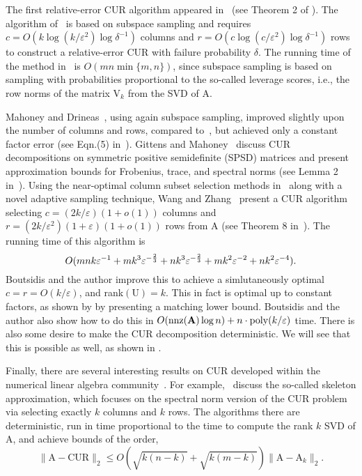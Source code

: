 \documentclass[11pt]{article}
\newcommand{\TNorm }[1]{\mbox{}\|#1\|_2  }
\newcommand{\mat}[1]{{\ensuremath{\bm{\mathrm{#1}}}}}
\def\matA{\mat{A}}
\def\matC{\mat{C}}
\def\matR{\mat{R}}
\def\matU{\mat{U}}
\def\matV{\mat{V}}
\def\nnz{{ \rm nnz }}
\def\frac#1#2{{#1\over #2}}
\newcommand{\eps}{\varepsilon}
\newcommand{\poly}{{\mathrm{poly}}}
\begin{document}
The first relative-error CUR algorithm appeared in~\cite{DMM08} (see Theorem 2 of \cite{DMM08}). The
algorithm of~\cite{DMM08} is based on subspace sampling and requires 
$c = O(k \log(k / \varepsilon^2)  \log \delta^{-1})$ columns and
$r=O(c \log (c / \varepsilon^2) \log \delta^{-1})$ rows to construct a relative-error CUR with failure probability $\delta$.
The running time of the method in~\cite{DMM08} is $O( m n \min\{m,n\} )$, since subspace sampling is based on sampling with probabilities
proportional to the so-called leverage scores, i.e., the row norms of the matrix $\matV_k$ from the SVD of $\matA$.

Mahoney and Drineas~\cite{DM09}, using again subspace sampling, improved slightly upon the number of columns and rows,
compared to~\cite{DMM08}, but achieved only a constant factor error (see Eqn.(5) in~\cite{DM09}).
Gittens and Mahoney~\cite{GM13} discuss CUR decompositions on symmetric positive semidefinite (SPSD) 
matrices and present approximation bounds for Frobenius,
trace, and spectral norms (see Lemma 2 in~\cite{GM13}).
Using the near-optimal column subset selection methods in~\cite{BDM11a} along with a novel adaptive sampling technique, Wang and Zhang~\cite{WZ13CUR} present a CUR
algorithm selecting
$c = (2k/\varepsilon)(1+o(1))$
columns and
$r = (2k/\varepsilon^2)(1+\varepsilon)(1+o(1))$
rows from $\matA$
(see Theorem 8 in~\cite{WZ13CUR}).
The running time of this algorithm is
$$
O( mnk\varepsilon^{-1} + mk^3\varepsilon^{-\frac{2}{3}} + nk^3\varepsilon^{-\frac{2}{3}} + mk^2\varepsilon^{-2} + nk^2\varepsilon^{-4}).
$$
Boutsidis and the author \cite{BW14} improve this to achieve a simlutaneously optimal $c = r = O(k/\eps)$, and rank$(\matU) = k$. 
This in fact is optimal up to constant factors, as shown by \cite{BW14} by presenting a matching lower bound. 
Boutsidis and the author also show how to do this in $O(\nnz(\matA) \log n) + n \cdot \poly(k/\eps)$ time. 
There is also some desire to make the CUR decomposition deterministic. 
We will see that this is possible as well, as shown in \cite{BW14}. 

Finally, there are several interesting results on CUR developed within 
the numerical linear algebra community~\cite{Tyr96, Tyr00, GTZ97a, GTZ97b,HP97, Pan03, MG03, GM04,BPSS05,Ste99}.
For example,~\cite{Tyr96, Tyr00, GTZ97a, GTZ97b} discuss the so-called skeleton approximation, which focuses on the spectral norm
version of the CUR problem via selecting exactly $k$ columns and $k$ rows. The algorithms there are deterministic, run
in time proportional to the time to compute the rank $k$ SVD of $\matA$, and achieve bounds of the order,
$$\TNorm{\matA-\matC\matU\matR} \le O( \sqrt{k(n-k)} + \sqrt{k(m-k)} )\TNorm{\matA-\matA_k}.$$
\end{document}
